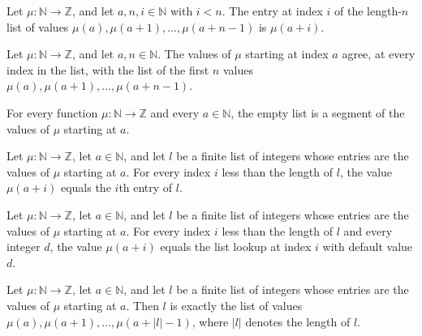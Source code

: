\begin{theorem}
\label{Light.getD_readSeg}
\leanok
{}
Let $\mu:\mathbb N\to\mathbb Z$, and let $a,n,i\in\mathbb N$ with $i<n$. The entry at
index $i$ of the length-$n$ list of values $\mu(a),\mu(a+1),\ldots,\mu(a+n-1)$ is
$\mu(a+i)$.
\end{theorem}

\begin{theorem}
\label{Light.seg_readSeg}
\leanok
{}
Let $\mu:\mathbb{N}\to\mathbb{Z}$, and let $a,n\in\mathbb{N}$. The values of $\mu$
starting at index $a$ agree, at every index in the list, with the list of the first $n$
values $\mu(a),\mu(a+1),\ldots,\mu(a+n-1)$.
\end{theorem}

\begin{theorem}
\label{Light.Seg.nil}
\leanok
{}
For every function $\mu:\mathbb{N}\to\mathbb{Z}$ and every $a\in\mathbb{N}$, the empty
list is a segment of the values of $\mu$ starting at $a$.
\end{theorem}

\begin{theorem}
\label{Light.Seg.get}
\leanok
{}
Let $\mu:\mathbb{N}\to\mathbb{Z}$, let $a\in\mathbb{N}$, and let $l$ be a finite list of
integers whose entries are the values of $\mu$ starting at $a$. For every index $i$ less
than the length of $l$, the value $\mu(a+i)$ equals the $i$th entry of $l$.
\end{theorem}

\begin{theorem}
\label{Light.Seg.getD}
\leanok
{}
Let $\mu:\mathbb{N}\to\mathbb{Z}$, let $a\in\mathbb{N}$, and let $l$ be a finite list of
integers whose entries are the values of $\mu$ starting at $a$. For every index $i$ less
than the length of $l$ and every integer $d$, the value $\mu(a+i)$ equals the list
lookup at index $i$ with default value $d$.
\end{theorem}

\begin{theorem}
\label{Light.Seg.eq_readSeg}
\leanok
{}
Let $\mu:\mathbb{N}\to\mathbb{Z}$, let $a\in\mathbb{N}$, and let $l$ be a finite list of
integers whose entries are the values of $\mu$ starting at $a$. Then $l$ is exactly the
list of values $\mu(a),\mu(a+1),\ldots,\mu(a+|l|-1)$, where $|l|$ denotes the length of
$l$.
\end{theorem}

